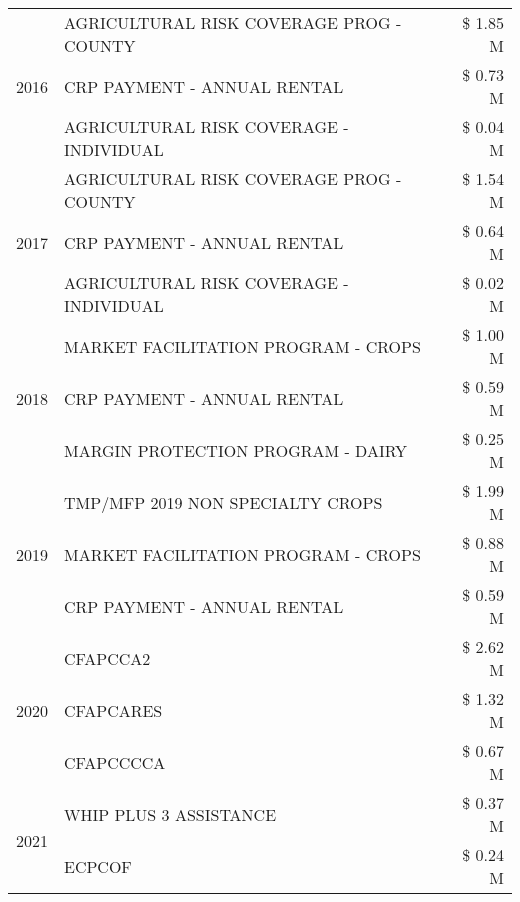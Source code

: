 \begin{tabular}{llr}
\multirow[t]{3}{*}{2016} & AGRICULTURAL RISK COVERAGE PROG - COUNTY & \$ 1.85 M \\
 & CRP PAYMENT - ANNUAL RENTAL & \$ 0.73 M \\
 & AGRICULTURAL RISK COVERAGE - INDIVIDUAL & \$ 0.04 M \\
\cline{1-3}
\multirow[t]{3}{*}{2017} & AGRICULTURAL RISK COVERAGE PROG - COUNTY & \$ 1.54 M \\
 & CRP PAYMENT - ANNUAL RENTAL & \$ 0.64 M \\
 & AGRICULTURAL RISK COVERAGE - INDIVIDUAL & \$ 0.02 M \\
\cline{1-3}
\multirow[t]{3}{*}{2018} & MARKET FACILITATION PROGRAM - CROPS & \$ 1.00 M \\
 & CRP PAYMENT - ANNUAL RENTAL & \$ 0.59 M \\
 & MARGIN PROTECTION PROGRAM - DAIRY & \$ 0.25 M \\
\cline{1-3}
\multirow[t]{3}{*}{2019} & TMP/MFP 2019 NON SPECIALTY CROPS & \$ 1.99 M \\
 & MARKET FACILITATION PROGRAM - CROPS & \$ 0.88 M \\
 & CRP PAYMENT - ANNUAL RENTAL & \$ 0.59 M \\
\cline{1-3}
\multirow[t]{3}{*}{2020} & CFAPCCA2 & \$ 2.62 M \\
 & CFAPCARES & \$ 1.32 M \\
 & CFAPCCCCA & \$ 0.67 M \\
\cline{1-3}
\multirow[t]{2}{*}{2021} & WHIP PLUS 3 ASSISTANCE & \$ 0.37 M \\
 & ECPCOF & \$ 0.24 M \\
\cline{1-3}
\bottomrule
\end{tabular}
